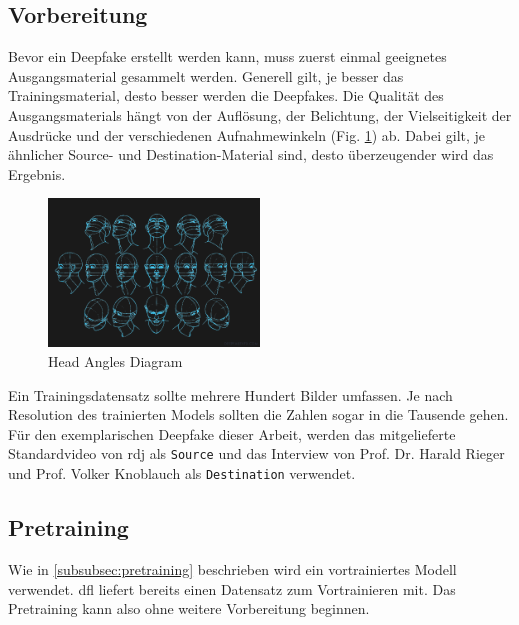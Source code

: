 \subsection{Vorbereitung}\label{subsec:vorbereitung}
Bevor ein Deepfake erstellt werden kann, muss zuerst einmal geeignetes Ausgangsmaterial gesammelt werden.
Generell gilt, je besser das Trainingsmaterial, desto besser werden die Deepfakes.
Die Qualität des Ausgangsmaterials hängt von der Auflösung, der Belichtung, der Vielseitigkeit der Ausdrücke und der verschiedenen Aufnahmewinkeln (Fig. \ref{fig:head-angles-diagram}) ab.
Dabei gilt, je ähnlicher Source- und Destination-Material sind, desto überzeugender wird das Ergebnis.
\begin{figure}
    \center
    \includegraphics[width=0.5\textwidth]{Bilder/DFL/Human_Head_Angles_Diagram}
    \caption{Head Angles Diagram}
    \label{fig:head-angles-diagram}
\end{figure}

Ein Trainingsdatensatz sollte mehrere Hundert Bilder umfassen.
Je nach Resolution des trainierten Models sollten die Zahlen sogar in die Tausende gehen.\\[0.5cm]

Für den exemplarischen Deepfake dieser Arbeit, werden das mitgelieferte Standardvideo von \gls{rdj} als \texttt{Source} und das Interview von Prof. Dr. Harald Rieger und Prof. Volker Knoblauch als \texttt{Destination} verwendet.

\subsection{Pretraining}\label{subsec:pretraining}
Wie in \ref{subsubsec:pretraining} beschrieben wird ein vortrainiertes Modell verwendet.
\gls{dfl} liefert bereits einen Datensatz zum Vortrainieren mit.
Das Pretraining kann also ohne weitere Vorbereitung beginnen.

